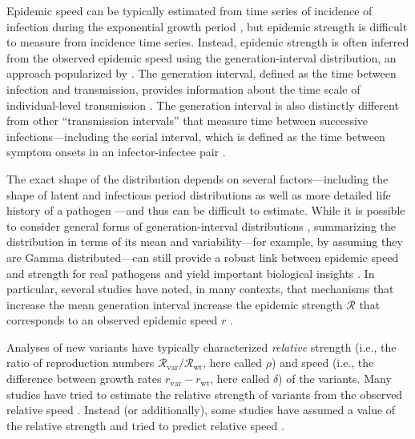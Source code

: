 \documentclass[12pt]{article}
\newcommand{\vvvar}{\mathrm{var}}
\newcommand{\wwwt}{\mathrm{wt}}
\newcommand{\rx}[1]{\ensuremath{{r}_{#1}}\xspace}
\newcommand{\rw}{\rx{\wwwt}}
\newcommand{\rv}{\rx{\vvvar}}
\newcommand{\Rx}[1]{\ensuremath{{\mathcal R}_{#1}}\xspace}
\newcommand{\RR}{\ensuremath{{\mathcal R}}\xspace}
\newcommand{\Rw}{\Rx{\wwwt}}
\newcommand{\Rv}{\Rx{\vvvar}}
\begin{document}
Epidemic speed can be typically estimated from time series of incidence of infection during the exponential growth period \citep{mills2004transmissibility,nishiura2009transmission,ma2014estimating}, but epidemic strength is difficult to measure from incidence time series.
Instead, epidemic strength is often inferred from the observed epidemic speed using the generation-interval distribution, an approach popularized by \citep{wallinga2007generation}.
The generation interval, defined as the time between infection and transmission, provides information about the time scale of individual-level transmission \citep{svensson2007note}.
The generation interval is also distinctly different from other ``transmission intervals'' that measure time between successive infections---including the serial interval, which is defined as the time between symptom onsets in an infector-infectee pair \citep{fine2003interval,grassly2008mathematical,britton2019estimation,ali2020serial,park2021forward}.

The exact shape of the distribution depends on several factors---including the shape of latent and infectious period distributions \citep{lloyd2001realistic,wearing2005appropriate,roberts2007model} as well as more detailed life history of a pathogen \citep{huber2016quantitative}---and thus can be difficult to estimate.
While it is possible to consider general forms of generation-interval distributions \citep{miller2010epidemics,svensson2015influence}, summarizing the distribution in terms of its mean and variability---for example, by assuming they are Gamma distributed---can still provide a robust link between epidemic speed and strength for real pathogens and yield important biological insights \citep{park2019practical}.
In particular, several studies have noted, in many contexts, that mechanisms that increase the mean generation interval increase the epidemic strength $\RR$ that corresponds to an observed epidemic speed $r$ \citep{eaton2014proportion,powers2014impact,weitz2015modeling,park2020time}.

Analyses of new variants have typically characterized \emph{relative} strength (i.e., the ratio of reproduction numbers $\Rv/\Rw$, here called $\rho$) and speed (i.e., the difference between growth rates $\rv-\rw$, here called $\delta$) of the variants.
Many studies have tried to estimate the relative strength of variants from the observed relative speed \citep{davies2021estimated, leung2021early, volz2021transmission,zhao2021,campbell2021increased}.
Instead (or additionally), some studies have assumed a value of the relative strength and tried to predict relative speed \citep{davies2021estimated,di2021impact}.
\end{document}
